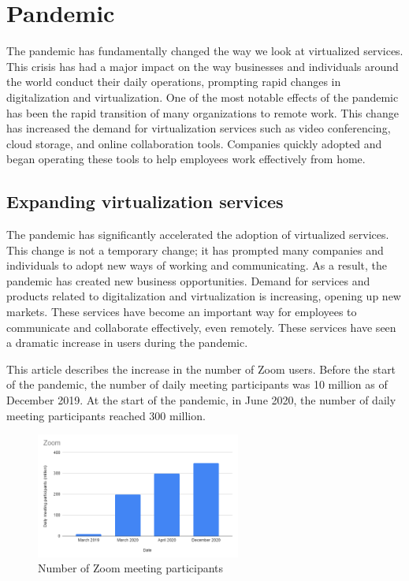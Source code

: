 \documentclass[12pt]{article}
\begin{document}
\section{Pandemic}
The pandemic has fundamentally changed the way we look at virtualized services.
This crisis has had a major impact on the way businesses and individuals around
the world conduct their daily operations, prompting rapid changes in
digitalization and virtualization. One of the most notable effects of the
pandemic has been the rapid transition of many organizations to remote work.
This change has increased the demand for virtualization services such as video
conferencing, cloud storage, and online collaboration tools. Companies quickly
adopted and began operating these tools to help employees work effectively from
home.

\subsection{Expanding virtualization services}
The pandemic has significantly accelerated the adoption of virtualized
services. This change is not a temporary change; it has prompted many companies
and individuals to adopt new ways of working and communicating. As a result,
the pandemic has created new business opportunities. Demand for services and
products related to digitalization and virtualization is increasing, opening up
new markets. These services have become an important way for employees to
communicate and collaborate effectively, even remotely. These services have
seen a dramatic increase in users during the pandemic.

This article \cite{zoom_status} describes
the increase in the number of Zoom users. Before the start of the pandemic, the
number of daily meeting participants was 10 million as of December 2019. At the
start of the pandemic, in June 2020, the number of daily meeting participants
reached 300 million.

\begin{figure}[H]
    \centering
    \includegraphics[width=0.6\textwidth]{zoom.png}
    \caption{Number of Zoom meeting participants}
    \label{fig:my_label}
\end{figure}
\end{document}
